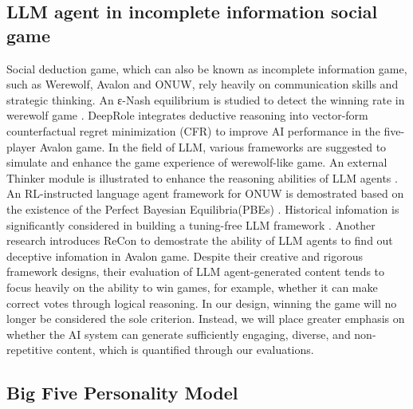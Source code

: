 \subsection{LLM agent in incomplete information social game} \label{sec:llm_agent_social_game}

Social deduction game, which can also be known as incomplete information game, such as Werewolf, Avalon and ONUW,  rely heavily on communication skills and strategic thinking. An ε-Nash equilibrium is studied to detect the winning rate in werewolf game \citep{bi2016human}. DeepRole \citep{serrino2019finding} integrates deductive reasoning into vector-form counterfactual regret minimization (CFR) to improve AI performance in the five-player Avalon game. In the field of LLM, various frameworks are suggested to simulate and enhance the game experience of werewolf-like game. An external Thinker module is illustrated to enhance the reasoning abilities of LLM agents \citep{wu2024enhance}. An RL-instructed language agent framework for ONUW is demostrated based on the existence of the Perfect Bayesian Equilibria(PBEs) \citep{jin2024learning}. Historical infomation is significantly considered in building a tuning-free LLM framework \citep{xu2023exploring}. Another research introduces ReCon to demostrate the ability of LLM agents to find out deceptive infomation in Avalon game. Despite their creative and rigorous framework designs, their evaluation of LLM agent-generated content tends to focus heavily on the ability to win games, for example, whether it can make correct votes through logical reasoning. In our design, winning the game will no longer be considered the sole criterion. Instead, we will place greater emphasis on whether the AI system can generate sufficiently engaging, diverse, and non-repetitive content, which is quantified through our evaluations.


\subsection{Big Five Personality Model} \label{sec:big_five_trait}


